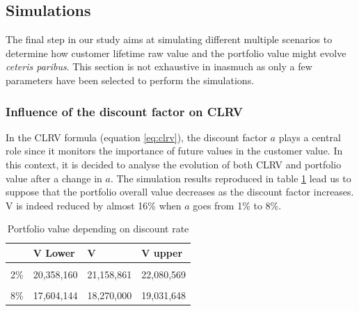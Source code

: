 \documentclass[
]{book}
\begin{document}
\hypertarget{simulations}{%
\subsection{Simulations}\label{simulations}}

The final step in our study aims at simulating different multiple scenarios to determine how customer lifetime raw value and the portfolio value might evolve \emph{ceteris paribus}. This section is not exhaustive in inasmuch as only a few parameters have been selected to perform the simulations.

\hypertarget{influence-of-the-discount-factor-on-clrv}{%
\subsubsection*{Influence of the discount factor on CLRV}\label{influence-of-the-discount-factor-on-clrv}}

In the CLRV formula (equation \eqref{eq:clrv}), the discount factor \(a\) plays a central role since it monitors the importance of future values in the customer value. In this context, it is decided to analyse the evolution of both CLRV and portfolio value after a change in \(a\). The simulation results reproduced in table \ref{tab:portValDiscountTab} lead us to suppose that the portfolio overall value decreases as the discount factor increases. V is indeed reduced by almost 16\% when \(a\) goes from 1\% to 8\%.

\begin{table}[H]

\caption{\label{tab:portValDiscountTab}Portfolio value depending on discount rate}
\centering
\begin{tabular}[t]{llll}
\toprule
  & V Lower & V & V upper\\
\midrule
\cellcolor{gray!6}{1\%} & \cellcolor{gray!6}{20,894,006} & \cellcolor{gray!6}{21,721,297} & \cellcolor{gray!6}{22,674,662}\\
2\% & 20,358,160 & 21,158,861 & 22,080,569\\
\cellcolor{gray!6}{4\%} & \cellcolor{gray!6}{19,357,495} & \cellcolor{gray!6}{20,108,832} & \cellcolor{gray!6}{20,971,852}\\
8\% & 17,604,144 & 18,270,000 & 19,031,648\\
\bottomrule
\end{tabular}
\end{table}
\end{document}

